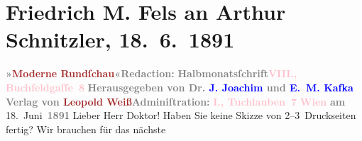

               \section[Friedrich M. Fels an Arthur Schnitzler, 18. 6. 1891]{ Friedrich M. Fels an Arthur Schnitzler,
                    18. 6. 1891}\nopagebreak{}\rehead{ }\normalsize\beginnumbering{} \toendnotes[C]{\smallbreak\pagebreak[2]} 
\toendnotes[C]{\smallbreak}\pstart
           \noindent{}{\pb}\textcolor{gray}{\textbf{»\textcolor{brown}{Moderne
                                Rundſchau}{}\ledrightnote{\textcolor{brown}{Moderne Dichtung/Moderne Rundschau}}«}}\hfill \textcolor{gray}{\textbf{Redaction:}}\pend
           \pstart
           \textcolor{gray}{\textbf{Halbmonatsſchrift}}\hfill \textcolor{gray}{\textbf{\textcolor{pink}{VIII., Buchfeldgaſſe 8}{}\ledrightnote{\textcolor{pink}{Buchfeldgasse}}}}\pend
           \pstart
           \textcolor{gray}{\textbf{Herausgegeben von \textbf{Dr. \textcolor{blue}{J. Joachim}{}\ledrightnote{\textcolor{blue}{Jaques Joachim}}} und \textbf{\textcolor{blue}{E. M. Kafka}{}\ledrightnote{\textcolor{blue}{Eduard Michael Kafka}}}}}\pend
           \pstart
           \textcolor{gray}{\textbf{Verlag von \textbf{\textcolor{brown}{Leopold Weiß}{}\ledrightnote{\textcolor{brown}{Leopold Weiss}}}}}\hfill \textcolor{gray}{\textbf{Adminiſtration:}}\pend
           \pstart
           \raggedleft{}\textcolor{gray}{\textbf{\textcolor{pink}{I., Tuchlauben 7}{}\ledrightnote{\textcolor{pink}{Tuchlauben}}}}\pend
           \pstart
           \raggedleft{}\textcolor{gray}{\textbf{\textcolor{pink}{Wien}{}\ledrightnote{\textcolor{pink}{Wien}}}}\pend
           \pstart
           \raggedleft{}\textcolor{gray}{\textbf{am}}{ }18. Juni \textcolor{gray}{\textbf{189}}1\pend
           \pstart\center{}Lieber Herr Doktor!\pend\pstart
           Haben Sie keine Skizze von 2–3 Druckseiten fertig? Wir brauchen für das nächste
